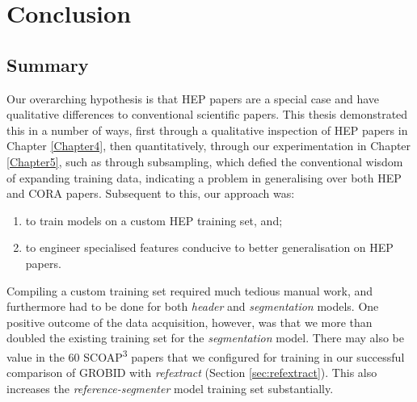 
\chapter{Conclusion} %

\label{Chapter6} %



\section{Summary}

Our overarching hypothesis is that HEP papers are a special case and have qualitative differences to conventional scientific papers. This thesis demonstrated this in a number of ways, first through a qualitative inspection of HEP papers in Chapter \ref{Chapter4}, then quantitatively, through our experimentation in Chapter \ref{Chapter5}, such as through subsampling, which defied the conventional wisdom of expanding training data, indicating a problem in generalising over both HEP and CORA papers. Subsequent to this, our approach was:

\begin{enumerate}
\item to train models on a custom HEP training set, and;
\item to engineer specialised features conducive to better generalisation on HEP papers.
\end{enumerate}

Compiling a custom training set required much tedious manual work, and furthermore had to be done for both \emph{header} and \emph{segmentation} models.  One positive outcome of the data acquisition, however, was that we more than doubled the existing training set for the \emph{segmentation} model. There may also be value in the 60 SCOAP\textsuperscript{3} papers that we configured for training in our successful comparison of GROBID with \emph{refextract} (Section \ref{sec:refextract}). This also increases the \emph{reference-segmenter} model training set substantially.


